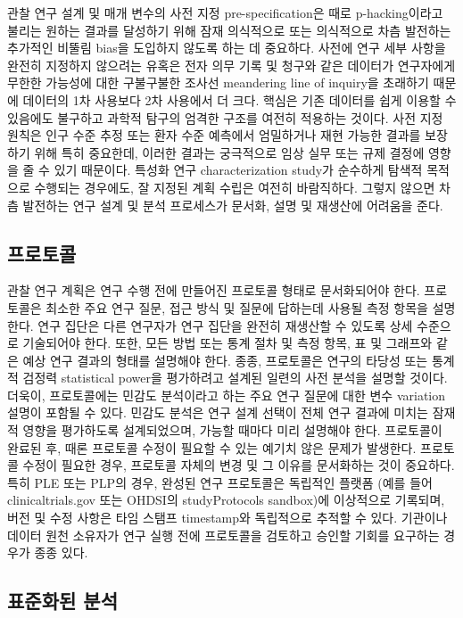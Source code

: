 \documentclass[10.5pt]{book}
\theoremstyle{definition}
\theoremstyle{definition}
\theoremstyle{definition}
\theoremstyle{remark}
\begin{document}
관찰 연구 설계 및 매개 변수의 사전 지정 pre-specification은 때로
p-hacking이라고 불리는 원하는 결과를 달성하기 위해 잠재 의식적으로 또는
의식적으로 차츰 발전하는 추가적인 비뚤림 bias을 도입하지 않도록 하는 데
중요하다. 사전에 연구 세부 사항을 완전히 지정하지 않으려는 유혹은 전자
의무 기록 및 청구와 같은 데이터가 연구자에게 무한한 가능성에 대한
구불구불한 조사선 meandering line of inquiry을 초래하기 때문에 데이터의
1차 사용보다 2차 사용에서 더 크다. 핵심은 기존 데이터를 쉽게 이용할 수
있음에도 불구하고 과학적 탐구의 엄격한 구조를 여전히 적용하는 것이다.
사전 지정 원칙은 인구 수준 추정 또는 환자 수준 예측에서 엄밀하거나 재현
가능한 결과를 보장하기 위해 특히 중요한데, 이러한 결과는 궁극적으로 임상
실무 또는 규제 결정에 영향을 줄 수 있기 때문이다. 특성화 연구
characterization study가 순수하게 탐색적 목적으로 수행되는 경우에도, 잘
지정된 계획 수립은 여전히 바람직하다. 그렇지 않으면 차츰 발전하는 연구
설계 및 분석 프로세스가 문서화, 설명 및 재생산에 어려움을 준다.

\subsection{프로토콜}


관찰 연구 계획은 연구 수행 전에 만들어진 프로토콜 형태로 문서화되어야
한다. 프로토콜은 최소한 주요 연구 질문, 접근 방식 및 질문에 답하는데
사용될 측정 항목을 설명한다. 연구 집단은 다른 연구자가 연구 집단을
완전히 재생산할 수 있도록 상세 수준으로 기술되어야 한다. 또한, 모든 방법
또는 통계 절차 및 측정 항목, 표 및 그래프와 같은 예상 연구 결과의 형태를
설명해야 한다. 종종, 프로토콜은 연구의 타당성 또는 통계적 검정력
statistical power을 평가하려고 설계된 일련의 사전 분석을 설명할 것이다.
더욱이, 프로토콜에는 민감도 분석이라고 하는 주요 연구 질문에 대한 변수
variation 설명이 포함될 수 있다. 민감도 분석은 연구 설계 선택이 전체
연구 결과에 미치는 잠재적 영향을 평가하도록 설계되었으며, 가능할 때마다
미리 설명해야 한다. 프로토콜이 완료된 후, 때론 프로토콜 수정이 필요할 수
있는 예기치 않은 문제가 발생한다. 프로토콜 수정이 필요한 경우, 프로토콜
자체의 변경 및 그 이유를 문서화하는 것이 중요하다. 특히 PLE 또는 PLP의
경우, 완성된 연구 프로토콜은 독립적인 플랫폼 (예를 들어
clinicaltrials.gov 또는 OHDSI의 studyProtocols sandbox)에 이상적으로
기록되며, 버전 및 수정 사항은 타임 스탬프 timestamp와 독립적으로 추적할
수 있다. 기관이나 데이터 원천 소유자가 연구 실행 전에 프로토콜을
검토하고 승인할 기회를 요구하는 경우가 종종 있다.

\subsection{표준화된 분석}\label{-}
\end{document}
